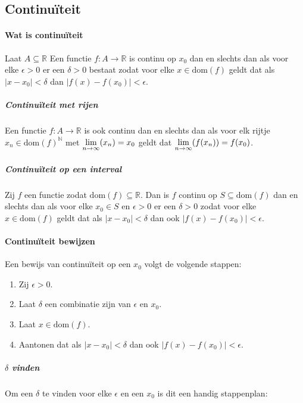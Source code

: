 \subsection{Continuïteit}

\paragraph{Wat is continuïteit} Laat $A\subseteq\mathbb{R}$ Een functie $f:A\to\mathbb{R}$ is continu op $x_{0}$ dan en slechts dan als voor elke $\epsilon>0$ er een $\delta>0$ bestaat zodat voor elke $x\in\text{dom}(f)$ geldt dat als $|x-x_{0}|<\delta$ dan $|f(x)-f(x_{0})|<\epsilon$.

\subparagraph{Continuïteit met rijen} Een functie $f:A\to\mathbb{R}$ is ook continu dan en slechts dan als voor elk rijtje $x_{n}\in\text{dom}(f)^{\mathbb{N}}$ met $\underset{n\to\infty}{\text{lim}}(x_{n})=x_{0}$ geldt dat $\underset{n\to\infty}{\text{lim}}(f(x_{n}))=f(x_{0})$.

\subparagraph{Continuïteit op een interval} Zij $f$ een functie zodat $\text{dom}(f)\subseteq\mathbb{R}$. Dan is $f$ continu op $S\subseteq\text{dom}(f)$ dan en slechts dan als voor elke $x_{0} \in S$ en $\epsilon>0$ er een $\delta>0$ zodat voor elke $x\in\text{dom}(f)$ geldt dat als $|x-x_{0}|<\delta$ dan ook $|f(x)-f(x_{0})|<\epsilon$.

\paragraph{Continuïteit bewijzen} Een bewijs van continuïteit op een $x_{0}$ volgt de volgende stappen:

\begin{enumerate}
    \setlength\itemsep{0em}
    \item Zij $\epsilon>0$.
    \item Laat $\delta$ een combinatie zijn van $\epsilon$ en $x_{0}$.
    \item Laat $x\in\text{dom}(f)$.
    \item Aantonen dat als $|x-x_{0}|<\delta$ dan ook $|f(x)-f(x_{0})|<\epsilon$.
\end{enumerate}

\subparagraph{$\delta$ vinden} Om een $\delta$ te vinden voor elke $\epsilon$ en een $x_{0}$ is dit een handig stappenplan:

